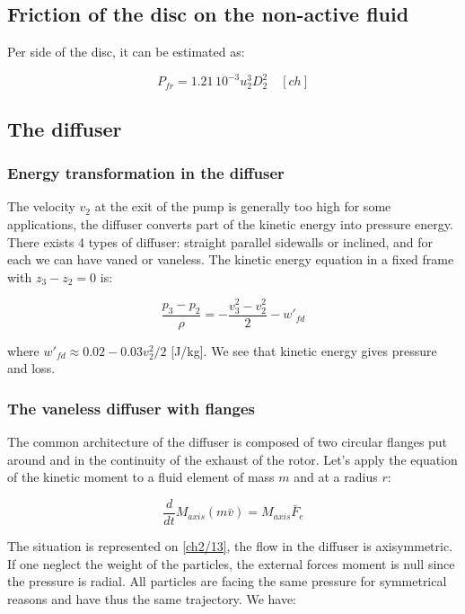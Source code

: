 \subsection{Friction of the disc on the non-active fluid}
Per side of the disc, it can be estimated as: 

\begin{equation}
P_{fr} = 1.21 \, 10^{-3} u_2^3 D_2^2 \quad [ch]
\end{equation}

\subsection{The diffuser}
\subsubsection{Energy transformation in the diffuser}
The velocity $v_2$ at the exit of the pump is generally too high for some applications, the diffuser converts part of the kinetic energy into pressure energy. There exists 4 types of diffuser: straight parallel sidewalls or inclined, and for each we can have vaned or vaneless. The kinetic energy equation in a fixed frame with $z_3 - z_2 = 0$ is: 

\begin{equation}
\frac{p_3-p_2}{\rho} = -\frac{v_3^2-v_2^2}{2} -w'_{fd}
\end{equation}

where $w'_{fd}\approx 0.02 - 0.03 v^2_2/2$ [J/kg]. We see that kinetic energy gives pressure and loss. 

\subsubsection{The vaneless diffuser with flanges} 
The common architecture of the diffuser is composed of two circular flanges put around and in the continuity of the exhaust of the rotor. Let's apply the equation of the kinetic moment to a fluid element of mass $m$ and at a radius $r$: 

\begin{equation}
\frac{d}{dt} M_{axis}(m\bar{v}) = M_{axis} \bar{F}_e
\end{equation}

The situation is represented on \autoref{ch2/13}, the flow in the diffuser is axisymmetric. If one neglect the weight of the particles, the external forces moment is null since the pressure is radial. All particles are facing the same pressure for symmetrical reasons and have thus the same trajectory. We have: 


